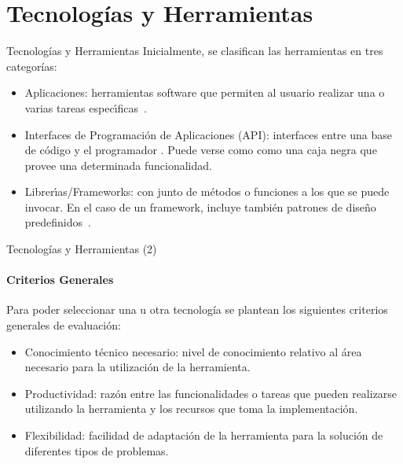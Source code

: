 \section{Tecnolog\'ias y Herramientas}

\begin{frame}{Tecnolog\'ias y Herramientas}
Inicialmente, se clasifican las herramientas en
tres categor\'ias:

\begin{itemize}
    \item Aplicaciones: herramientas software que permiten al usuario realizar una o
    varias tareas \mbox{espec{\'\i}ficas \cite{GoodwillComputer}}.
    \item Interfaces de Programaci\'on de Aplicaciones (API): interfaces entre una base de c\'odigo y
    el programador \cite{DoucetteOnApi}. Puede verse como como una caja negra
    que provee una determinada funcionalidad.
    \item Librer{\'\i}as/Frameworks: con junto de m\'etodos o funciones a los que se puede invocar.
    En el caso de un framework, incluye tambi\'en patrones de dise\~no
    \mbox{predefinidos \cite{FowlerInversion}}.
\end{itemize}
\end{frame}

\begin{frame}{Tecnolog\'ias y Herramientas (2)}
\framesubtitle{Criterios Generales}
Para poder seleccionar una u otra tecnolog\'ia se plantean los siguientes criterios generales de evaluaci\'on:

\begin{itemize}
   \item Conocimiento t\'ecnico necesario: nivel de conocimiento relativo al \'area necesario para la
   utilizaci\'on de la herramienta. 
   \item Productividad: raz\'on entre las funcionalidades o tareas que pueden
   realizarse utilizando la herramienta y los recursos que toma la implementaci\'on.
   \item Flexibilidad: facilidad de adaptaci\'on de la herramienta para la soluci\'on de diferentes
   tipos de problemas.
\end{itemize}
\end{frame}

